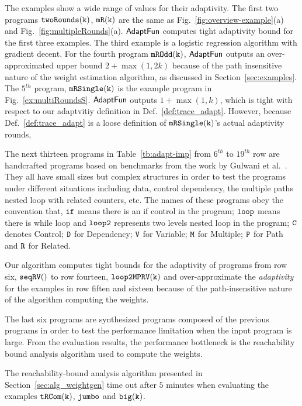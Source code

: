 The examples show a wide range of values for their adaptivity. 
The first two programs $\mathtt{twoRounds(k)}$, $ \mathtt{mR(k)}$ are the same as Fig.~\ref{fig:overview-example}(a) and Fig.~\ref{fig:multipleRounds}(a).
$\textsf{AdaptFun}$ computes tight adaptivity bound for the first three examples.
The third example is a logistic regression algorithm with gradient decent.
For the fourth program $\mathtt{mROdd(k)}$, $\textsf{AdaptFun}$ outputs an over-approximated upper bound $2 + \max(1, 2k)$ 
because of the path insensitive nature of the weight estimation algorithm, as discussed in Section~\ref{sec:examples}. 
The $5^{th}$ program, $\mathtt{mRSingle(k)}$ is the example program in Fig.~\ref{ex:multiRoundsS}.
$\textsf{AdaptFun}$ outputs $1 + \max(1, k) $, which is tight with respect to our adaptvitiy definition in Def.~\ref{def:trace_adapt}.
However, because Def.~\ref{def:trace_adapt} is a loose definition of $\mathtt{mRSingle(k)}$'s actual adaptivity rounds,
%

The next thirteen programs in Table~\ref{tb:adapt-imp} from $6^{th}$ to $19^{th}$ row are handcrafted programs based on benchmarks from the work by Gulwani et al.~\cite{GulwaniJK09}. They all have small sizes but complex structures in order to test the programs under different situations including
data, control dependency,
the multiple paths nested loop with related counters, etc.
The names of these programs obey the convention that,
$\mathtt{if}$ means there is an if control in the program;
$\mathtt{loop}$ means there is while loop and $\mathtt{loop2}$ represents two levels nested loop in the program;
$\mathtt{C}$ denotes Control;
$\mathtt{D}$ for Dependency; $\mathtt{V}$ for Variable;
$\mathtt{M}$ for Multiple; $\mathtt{P}$ for Path and $\mathtt{R}$ for Related.


Our algorithm computes tight bounds for the adaptivity of programs from row six, $\mathtt{seqRV()}$ to row fourteen, $\mathtt{loop2MPRV(k)}$
and over-approximate the \emph{adaptivity} for the  examples in row fiften and sixteen because of the path-insensitive nature of the algorithm computing the weights.

The last six programs are synthesized programs composed of the previous programs in order to test the performance limitation when the input program is large. 
From the evaluation results, the performance bottleneck is the reachability bound analysis algorithm used to compute the weights.

The reachability-bound analysis algorithm presented in Section~\ref{sec:alg_weightgen} time out after $5$ minutes when evaluating the examples $\mathtt{tRCom(k)}$,  $\mathtt{jumbo}$ and ${\mathtt{big(k)}}$.

